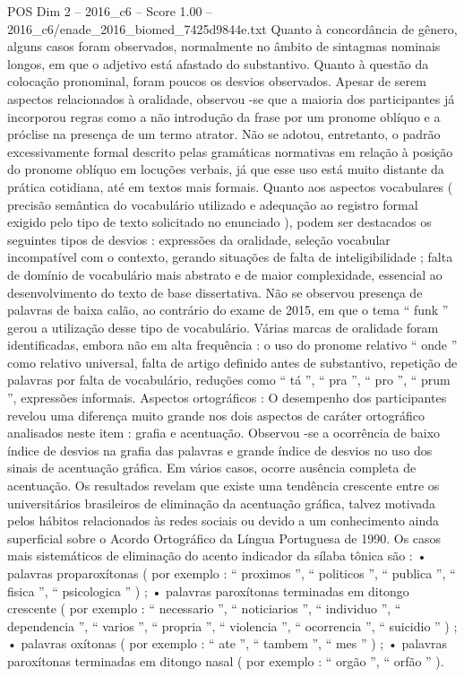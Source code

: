 \begin{textsample}{POS Dim 2 – 2016\_c6 – Score 1.00 – 2016\_c6/enade\_2016\_biomed\_7425d9844e.txt}
Quanto à concordância de gênero, alguns casos foram observados, normalmente no âmbito de sintagmas nominais longos, em que o adjetivo está afastado do substantivo.
Quanto à questão da colocação pronominal, foram poucos os desvios observados.
Apesar de serem aspectos relacionados à oralidade, observou -se que a maioria dos participantes já incorporou regras como a não introdução da frase por um pronome oblíquo e a próclise na presença de um termo atrator.
Não se adotou, entretanto, o padrão excessivamente formal descrito pelas gramáticas normativas em relação à posição do pronome oblíquo em locuções verbais, já que esse uso está muito distante da prática cotidiana, até em textos mais formais.
Quanto aos aspectos vocabulares ( precisão semântica do vocabulário utilizado e adequação ao registro formal exigido pelo tipo de texto solicitado no enunciado ), podem ser destacados os seguintes tipos de desvios : expressões da oralidade, seleção vocabular incompatível com o contexto, gerando situações de falta de inteligibilidade ; falta de domínio de vocabulário mais abstrato e de maior complexidade, essencial ao desenvolvimento do texto de base dissertativa.
Não se observou presença de palavras de baixa calão, ao contrário do exame de 2015, em que o tema “ funk ” gerou a utilização desse tipo de vocabulário.
Várias marcas de oralidade foram identificadas, embora não em alta frequência : o uso do pronome relativo “ onde ” como relativo universal, falta de artigo definido antes de substantivo, repetição de palavras por falta de vocabulário, reduções como “ tá ”, “ pra ”, “ pro ”, “ prum ”, expressões informais.
Aspectos ortográficos : O desempenho dos participantes revelou uma diferença muito grande nos dois aspectos de caráter ortográfico analisados neste item : grafia e acentuação.
Observou -se a ocorrência de baixo índice de desvios na grafia das palavras e grande índice de desvios no uso dos sinais de acentuação gráfica.
Em vários casos, ocorre ausência completa de acentuação.
Os resultados revelam que existe uma tendência crescente entre os universitários brasileiros de eliminação da acentuação gráfica, talvez motivada pelos hábitos relacionados às redes sociais ou devido a um conhecimento ainda superficial sobre o Acordo Ortográfico da Língua Portuguesa de 1990.
Os casos mais sistemáticos de eliminação do acento indicador da sílaba tônica são : • palavras proparoxítonas ( por exemplo : “ proximos ”, “ politicos ”, “ publica ”, “ fisica ”, “ psicologica ” ) ; • palavras paroxítonas terminadas em ditongo crescente ( por exemplo : “ necessario ”, “ noticiarios ”, “ individuo ”, “ dependencia ”, “ varios ”, “ propria ”, “ violencia ”, “ ocorrencia ”, “ suicidio ” ) ; • palavras oxítonas ( por exemplo : “ ate ”, “ tambem ”, “ mes ” ) ; • palavras paroxítonas terminadas em ditongo nasal ( por exemplo : “ orgão ”, “ orfão ” ).

\end{textsample}
